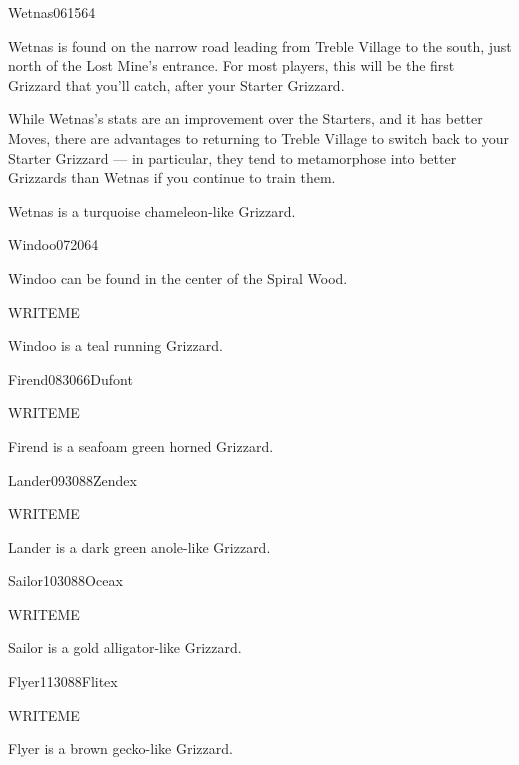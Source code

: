 \documentclass[10pt,twocolumn]{memoir}
\begin{document}
\begin{grizzardpage}{Wetnas}{06}{15}{6}{4}{}

  Wetnas is found on the narrow  road leading from Treble Village to the
  south, just north of the Lost  Mine's entrance. For most players, this
  will   be  the   first  Grizzard   that  you'll   catch,  after   your
  Starter Grizzard.

  While Wetnas's stats are an improvement  over the Starters, and it has
  better Moves, there  are advantages to returning to  Treble Village to
  switch back  to your Starter  Grizzard —  in particular, they  tend to
  metamorphose  into better  Grizzards than  Wetnas if  you continue  to
  train them.

  Wetnas is a turquoise chameleon-like Grizzard.
  
\end{grizzardpage}

\begin{grizzardpage}{Windoo}{07}{20}{6}{4}{}

  Windoo can be found in the center of the Spiral Wood.

WRITEME
  
  Windoo is a teal running Grizzard.

\end{grizzardpage}

\begin{grizzardpage}{Firend}{08}{30}66{Dufont}

WRITEME
  
  Firend is a seafoam green horned Grizzard.

\end{grizzardpage}

\begin{grizzardpage}{Lander}{09}{30}88{Zendex}

WRITEME
  
  Lander is a dark green anole-like Grizzard.

\end{grizzardpage}

\begin{grizzardpage}{Sailor}{10}{30}88{Oceax}

WRITEME
  
  Sailor is a gold alligator-like Grizzard.

\end{grizzardpage}

\begin{grizzardpage}{Flyer}{11}{30}88{Flitex}

WRITEME
  
  Flyer is a brown gecko-like Grizzard.

\end{grizzardpage}
\end{document}
